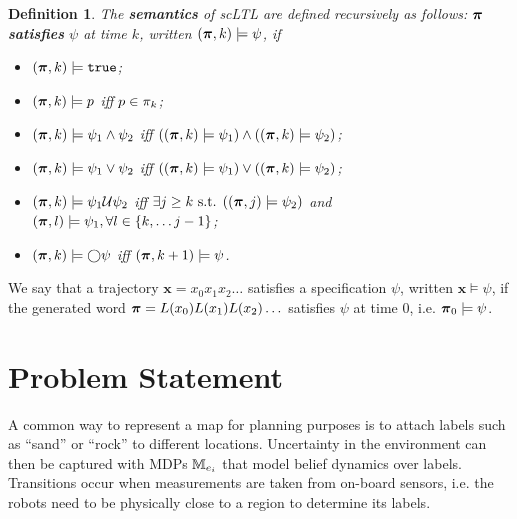 \documentclass[conference]{IEEEtran}
\newtheorem{definition}{Definition}
\begin{document}
\begin{definition}
 The \textbf{semantics} of scLTL are defined recursively as follows: $\boldsymbol{\pi}$ \textbf{satisfies} $\psi$ at time $k$, written $(\boldsymbol{\pi}, k) \models \psi$, if
 \begin{itemize}
    \item $(\boldsymbol{\pi}, k) \models \texttt{true}$;
    \item $(\boldsymbol{\pi}, k) \models p$ iff $p \in \pi_k$;
    \item $(\boldsymbol{\pi}, k) \models \psi_1 \land  \psi_2  $ iff $ ( (\boldsymbol{\pi}, k) \models \psi_1 ) \land ( (\boldsymbol{\pi}, k) \models \psi_2 ) $;
    \item $(\boldsymbol{\pi}, k) \models \psi_1 \lor  \psi_2  $ iff $ ( (\boldsymbol{\pi}, k) \models \psi_1 ) \lor ( (\boldsymbol{\pi}, k) \models \psi_2 ) $;
    \item $(\boldsymbol{\pi}, k) \models  \psi_1 \mathcal{U} \psi_2 $ iff $\exists j \geq k \text{ s.t. } ((\boldsymbol{\pi}, j) \models \psi_2 ) $ and $(\boldsymbol{\pi}, l) \models \psi_1, \forall l \in \{k, \ldots j-1\}$;
    \item $(\boldsymbol{\pi}, k) \models \bigcirc \psi$ iff $(\boldsymbol{\pi}, k+1) \models \psi$.
 \end{itemize}

\end{definition}

We say that a trajectory $\mathbf{x} = x_0 x_1 x_2 \ldots$ satisfies a specification $\psi$, written $\mathbf{x} \models \psi$, if the generated word $\boldsymbol{\pi} =L(x_0) L(x_1) L(x_2) \ldots$ satisfies $\psi$ at time 0, i.e. $\boldsymbol{\pi}_0 \models \psi$.


\section{Problem Statement}

A common way to represent a map for planning purposes is to attach labels such as ``sand'' or ``rock'' to different locations. Uncertainty in the environment can then be captured with MDPs $\mathbb{M}_{e_i}$ that model belief dynamics over labels. Transitions occur when measurements are taken from on-board sensors, i.e. the robots need to be physically close to a region to determine its labels. 
\end{document}
